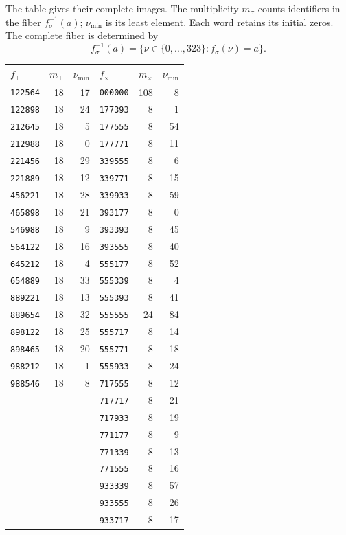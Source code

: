 The table gives their complete images. The multiplicity \(m_\sigma\)
counts identifiers in the fiber \(f_\sigma^{-1}(a)\); \(\nu_{\min}\)
is its least element. Each word retains its initial zeros. The complete
fiber is determined by
\[
 f_\sigma^{-1}(a)=\{\nu\in\{0,\ldots,323\}:f_\sigma(\nu)=a\}.
\]
\begin{center}\small
\begin{tabular}{@{}lrr@{\qquad}lrr@{}}
\toprule
\(f_+\) & \(m_+\) & \(\nu_{\min}\) & \(f_\times\) & \(m_\times\) & \(\nu_{\min}\)\\
\midrule
\texttt{122564} & 18 & 17 & \texttt{000000} & 108 & 8 \\
\texttt{122898} & 18 & 24 & \texttt{177393} & 8 & 1 \\
\texttt{212645} & 18 & 5 & \texttt{177555} & 8 & 54 \\
\texttt{212988} & 18 & 0 & \texttt{177771} & 8 & 11 \\
\texttt{221456} & 18 & 29 & \texttt{339555} & 8 & 6 \\
\texttt{221889} & 18 & 12 & \texttt{339771} & 8 & 15 \\
\texttt{456221} & 18 & 28 & \texttt{339933} & 8 & 59 \\
\texttt{465898} & 18 & 21 & \texttt{393177} & 8 & 0 \\
\texttt{546988} & 18 & 9 & \texttt{393393} & 8 & 45 \\
\texttt{564122} & 18 & 16 & \texttt{393555} & 8 & 40 \\
\texttt{645212} & 18 & 4 & \texttt{555177} & 8 & 52 \\
\texttt{654889} & 18 & 33 & \texttt{555339} & 8 & 4 \\
\texttt{889221} & 18 & 13 & \texttt{555393} & 8 & 41 \\
\texttt{889654} & 18 & 32 & \texttt{555555} & 24 & 84 \\
\texttt{898122} & 18 & 25 & \texttt{555717} & 8 & 14 \\
\texttt{898465} & 18 & 20 & \texttt{555771} & 8 & 18 \\
\texttt{988212} & 18 & 1 & \texttt{555933} & 8 & 24 \\
\texttt{988546} & 18 & 8 & \texttt{717555} & 8 & 12 \\
 & &  & \texttt{717717} & 8 & 21 \\
 & &  & \texttt{717933} & 8 & 19 \\
 & &  & \texttt{771177} & 8 & 9 \\
 & &  & \texttt{771339} & 8 & 13 \\
 & &  & \texttt{771555} & 8 & 16 \\
 & &  & \texttt{933339} & 8 & 57 \\
 & &  & \texttt{933555} & 8 & 26 \\
 & &  & \texttt{933717} & 8 & 17 \\
\bottomrule
\end{tabular}
\end{center}

